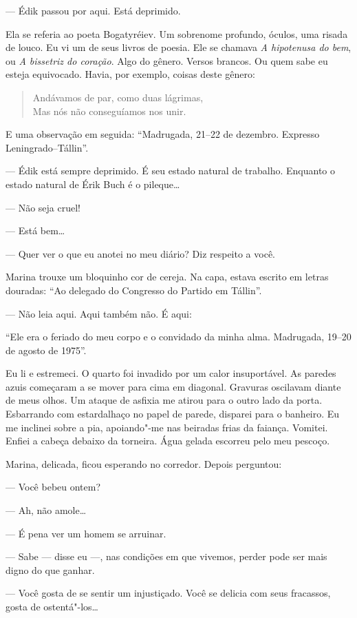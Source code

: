--- Édik passou por aqui. Está deprimido.

Ela se referia ao poeta Bogatyréiev. Um sobrenome profundo, óculos, uma
risada de louco. Eu vi um de seus livros de poesia. Ele se chamava
\emph{A hipotenusa do bem}, ou \emph{A bissetriz do coração}. Algo do
gênero. Versos brancos. Ou quem sabe eu esteja equivocado. Havia, por
exemplo, coisas deste gênero:

\begin{verse}
Andávamos de par, como duas lágrimas,\\
Mas nós não conseguíamos nos unir.
\end{verse}

E uma observação em seguida: ``Madrugada, 21--22 de dezembro. Expresso
Leningrado--Tállin''.

--- Édik está sempre deprimido. É seu estado natural de trabalho.
Enquanto o estado natural de Érik Buch é o pileque\ldots{}

--- Não seja cruel!

--- Está bem\ldots{}

--- Quer ver o que eu anotei no meu diário? Diz respeito a você.

Marina trouxe um bloquinho cor de cereja. Na capa, estava escrito em
letras douradas: ``Ao delegado do Congresso do Partido em Tállin''.

--- Não leia aqui. Aqui também não. É aqui:

``Ele era o feriado do meu corpo e o convidado da minha alma. Madrugada,
19--20 de agosto de 1975''.

Eu li e estremeci. O quarto foi invadido por um calor insuportável. As
paredes azuis começaram a se mover para cima em diagonal. Gravuras
oscilavam diante de meus olhos. Um ataque de asfixia me atirou para o
outro lado da porta. Esbarrando com estardalhaço no papel de parede,
disparei para o banheiro. Eu me inclinei sobre a pia, apoiando"-me nas
beiradas frias da faiança. Vomitei. Enfiei a cabeça debaixo da torneira.
Água gelada escorreu pelo meu pescoço.

Marina, delicada, ficou esperando no corredor. Depois perguntou:

--- Você bebeu ontem?

--- Ah, não amole\ldots{}

--- É pena ver um homem se arruinar.

--- Sabe --- disse eu ---, nas condições em que vivemos, perder pode ser
mais digno do que ganhar.

--- Você gosta de se sentir um injustiçado. Você se delicia com seus
fracassos, gosta de ostentá"-los\ldots{}

